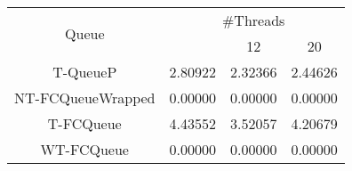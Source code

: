 \begin{tabular}{|c|c|c|c|}
\hline
\multirow{2}{*}{Queue} & \multicolumn{3}{c|}{\#Threads}\\\cline{2-4}& \quad 4 & 12 & 20\\
\hline
\hline
T-QueueP & 2.80922 & 2.32366 & 2.44626\\
NT-FCQueueWrapped & 0.00000 & 0.00000 & 0.00000\\
T-FCQueue & 4.43552 & 3.52057 & 4.20679\\
WT-FCQueue & 0.00000 & 0.00000 & 0.00000\\
\hline\end{tabular}
